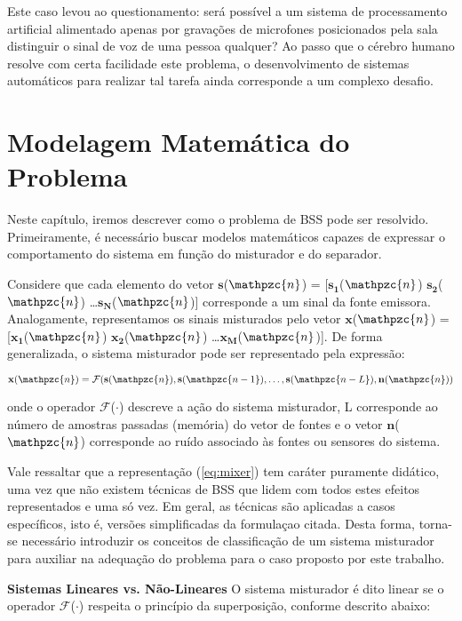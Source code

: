     Este caso levou ao questionamento: será possível a um sistema de processamento artificial alimentado apenas por gravações de microfones posicionados pela sala distinguir o sinal de voz de uma pessoa qualquer? Ao passo que o cérebro humano resolve com certa facilidade este problema, o desenvolvimento de sistemas automáticos para realizar tal tarefa ainda corresponde a um complexo desafio.

\section{Modelagem Matemática do Problema}
    Neste capítulo, iremos descrever como o problema de BSS pode ser resolvido. Primeiramente, é necessário buscar modelos matemáticos capazes de expressar o comportamento do sistema em função do misturador e do separador.
    
    Considere que cada elemento do vetor $\mathbf{s}$($\mathpzc{n}$) = [$\mathbf{s_1}$($\mathpzc{n}$) $\mathbf{s_2}$($\mathpzc{n}$) \dots  $\mathbf{s_N}$($\mathpzc{n}$)] corresponde a um sinal da fonte emissora. Analogamente, representamos os sinais misturados pelo vetor  $\mathbf{x}$($\mathpzc{n}$) = [$\mathbf{x_1}$($\mathpzc{n}$) $\mathbf{x_2}$($\mathpzc{n}$) \dots  $\mathbf{x_M}$($\mathpzc{n}$)]. De forma generalizada, o sistema misturador pode ser representado pela expressão:

    \begin{equation}\label{eq:mixer}
        \mathbf{x}(\mathpzc{n}) = \mathcal{F}(\mathbf{s}(\mathpzc{n}), \mathbf{s}(\mathpzc{n-1}), \dots, \mathbf{s}(\mathpzc{n - L}), \mathbf{n}(\mathpzc{n}))
    \end{equation}
    
    onde o operador $\mathcal{F}$($\cdot$) descreve a ação do sistema misturador, L corresponde ao número de amostras passadas (memória) do vetor de fontes e o vetor $\mathbf{n}$($\mathpzc{n}$) corresponde ao ruído associado às fontes ou sensores do sistema.
    
    Vale ressaltar que a representação (\ref{eq:mixer}) tem caráter puramente didático, uma vez que não existem técnicas de BSS que lidem com todos estes efeitos representados e uma só vez. Em geral, as técnicas são aplicadas a casos específicos, isto é, versões simplificadas da formulaçao citada. Desta forma, torna-se necessário introduzir os conceitos de classificação de um sistema misturador para auxiliar na adequação do problema para o caso proposto por este trabalho.
    
    \textbf{Sistemas Lineares vs. Não-Lineares} O sistema misturador é dito linear se o operador  $\mathcal{F}$($\cdot$) respeita o princípio da superposição, conforme descrito abaixo:

